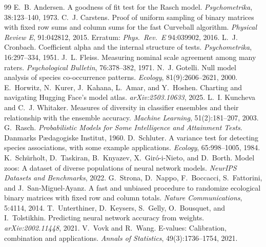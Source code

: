 \documentclass{article}
\begin{document}
\begin{thebibliography}{99}
\small
{} E.~B. Andersen. A goodness of fit test for the Rasch model. \emph{Psychometrika}, 38:123--140, 1973.
 C.~J. Carstens. Proof of uniform sampling of binary matrices with fixed row sums and column sums for the fast Curveball algorithm. \emph{Physical Review E}, 91:042812, 2015. Erratum: \emph{Phys.\ Rev.\ E} 94:039902, 2016.
 L.~J. Cronbach. Coefficient alpha and the internal structure of tests. \emph{Psychometrika}, 16:297--334, 1951.
 J.~L. Fleiss. Measuring nominal scale agreement among many raters. \emph{Psychological Bulletin}, 76:378--382, 1971.
 N.~J. Gotelli. Null model analysis of species co-occurrence patterns. \emph{Ecology}, 81(9):2606--2621, 2000.
 E.~Horwitz, N.~Kurer, J.~Kahana, L.~Amar, and Y.~Hoshen. Charting and navigating Hugging Face's model atlas. \emph{arXiv:2503.10633}, 2025.
 L.~I. Kuncheva and C.~J. Whitaker. Measures of diversity in classifier ensembles and their relationship with the ensemble accuracy. \emph{Machine Learning}, 51(2):181--207, 2003.
 G.~Rasch. \emph{Probabilistic Models for Some Intelligence and Attainment Tests}. Danmarks P\ae dagogiske Institut, 1960.
 D.~Schluter. A variance test for detecting species associations, with some example applications. \emph{Ecology}, 65:998--1005, 1984.
 K.~Sch{\"u}rholt, D.~Taskiran, B.~Knyazev, X.~Gir{\'o}-i-Nieto, and D.~Borth. Model zoos: A dataset of diverse populations of neural network models. \emph{NeurIPS Datasets and Benchmarks}, 2022.
 G.~Strona, D.~Nappo, F.~Boccacci, S.~Fattorini, and J.~San-Miguel-Ayanz. A fast and unbiased procedure to randomize ecological binary matrices with fixed row and column totals. \emph{Nature Communications}, 5:4114, 2014.
 T.~Unterthiner, D.~Keysers, S.~Gelly, O.~Bousquet, and I.~Tolstikhin. Predicting neural network accuracy from weights. \emph{arXiv:2002.11448}, 2021.
 V.~Vovk and R.~Wang. E-values: Calibration, combination and applications. \emph{Annals of Statistics}, 49(3):1736--1754, 2021.
\end{thebibliography}
\end{document}
